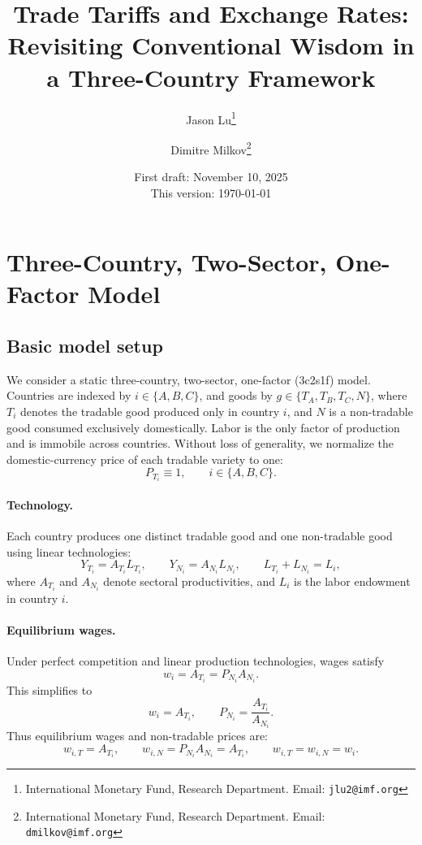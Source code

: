 \documentclass[11pt]{article}
\title{Trade Tariffs and Exchange Rates: Revisiting Conventional Wisdom in a Three-Country Framework}
\author{
Jason Lu\thanks{International Monetary Fund, Research Department. Email: {\tt jlu2@imf.org}} 
\and 
Dimitre Milkov\thanks{International Monetary Fund, Research Department. Email: {\tt dmilkov@imf.org}}
}
\date{First draft: November 10, 2025 \\ This version: \today}
\begin{document}
\maketitle

\section*{Three-Country, Two-Sector, One-Factor Model}

\subsection*{Basic model setup}

We consider a static three-country, two-sector, one-factor (3c2s1f) model. 
Countries are indexed by $i \in \{A,B,C\}$, and goods by 
$g \in \{T_A, T_B, T_C, N\}$, where $T_i$ denotes the tradable good produced only in country $i$, and $N$ is a non-tradable good consumed exclusively domestically. Labor is the only factor of production and is immobile across countries. Without loss of generality, we normalize the domestic-currency price of each tradable variety to one:
\[
P_{T_i} \equiv 1, \qquad i \in \{A,B,C\}.
\]

\paragraph{Technology.}
Each country produces one distinct tradable good and one non-tradable good using linear technologies:
\begin{equation}
Y_{T_i} = A_{T_i} L_{T_i}, 
\qquad 
Y_{N_i} = A_{N_i} L_{N_i}, 
\qquad 
L_{T_i} + L_{N_i} = L_i,
\end{equation}
where $A_{T_i}$ and $A_{N_i}$ denote sectoral productivities, and $L_i$ is the labor endowment in country $i$.

\paragraph{Equilibrium wages.}
Under perfect competition and linear production technologies, wages satisfy
\begin{equation}
w_i = A_{T_i} = P_{N_i} A_{N_i}.
\label{eq:wage}
\end{equation}
This simplifies to
\[
w_i = A_{T_i}, 
\qquad 
P_{N_i} = \frac{A_{T_i}}{A_{N_i}}.
\]
Thus equilibrium wages and non-tradable prices are:
\[
w_{i,T} = A_{T_i}, 
\qquad 
w_{i,N} = P_{N_i} A_{N_i} = A_{T_i}, 
\qquad 
w_{i,T} = w_{i,N} = w_i.
\]
\end{document}
